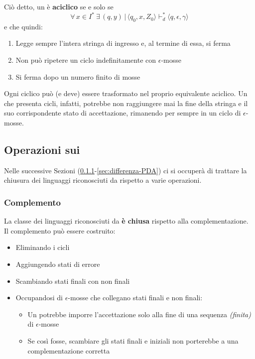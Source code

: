 \documentclass[italian, 10pt]{article}
\begin{document}
Ciò detto, un \PDA è \textbf{aciclico} se e solo se
\[ \forall \, x \in I^\ast \ \exists \, (q, y) \, | \, \langle q_0, x, Z_0 \rangle \vdash^\ast_d  \langle q, \epsilon, \gamma \rangle \]
e che quindi:

\begin{enumerate}
  \item Legge sempre l'intera stringa di ingresso e, al termine di essa, si ferma
  \item Non può ripetere un ciclo indefinitamente con \(\epsilon\)-mosse
  \item Si ferma dopo un numero finito di mosse
\end{enumerate}

Ogni \PDA ciclico può (e deve) essere trasformato nel proprio equivalente aciclico.
Un \PDA che presenta cicli, infatti, potrebbe non raggiungere mai la fine della stringa e il suo corrispondente stato di accettazione, rimanendo per sempre in un ciclo di \(\epsilon\)-mosse.

\subsection{Operazioni sui \PDA}

Nelle successive Sezioni (\ref{sec:complemento-PDA}-\ref{sec:differenza-PDA}) ci si occuperà di trattare la chiusura dei linguaggi riconosciuti da \PDA rispetto a varie operazioni.

\subsubsection{Complemento}
\label{sec:complemento-PDA}

La classe dei linguaggi riconosciuti da \PDA \textbf{è chiusa} rispetto alla complementazione.
Il complemento può essere costruito:

\begin{itemize}
  \item Eliminando i cicli
  \item Aggiungendo stati di errore
  \item Scambiando stati finali con non finali
  \item Occupandosi di \(\epsilon\)-mosse che collegano stati finali e non finali:
        \begin{itemize}
          \item Un \PDA potrebbe imporre l'accettazione solo alla fine di una sequenza \textit{(finita)} di \(\epsilon\)-mosse
          \item Se così fosse, scambiare gli stati finali e iniziali non porterebbe a una complementazione corretta
        \end{itemize}
\end{itemize}
\end{document}
